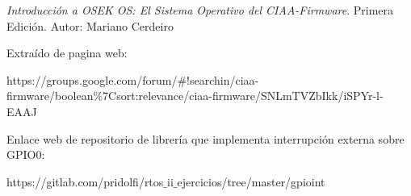 \documentclass[12pt,letterpaper]{article}
\begin{document}
\begin{thebibliography}{}
\textit{Introducción a OSEK OS: El Sistema Operativo del CIAA-Firmware}. Primera Edición. Autor: Mariano Cerdeiro

 Extraído de pagina web:

{\footnotesize https://groups.google.com/forum/$\#$!searchin/ciaa-firmware/boolean\%7Csort:relevance/ciaa-firmware/SNLmTVZbIkk/iSPYr-l-EAAJ}

 Enlace web de repositorio de librería que implementa interrupción externa sobre GPIO0:

{\footnotesize https://gitlab.com/pridolfi/rtos$\_$ii$\_$ejercicios/tree/master/gpioint}
\end{thebibliography}
\end{document}
